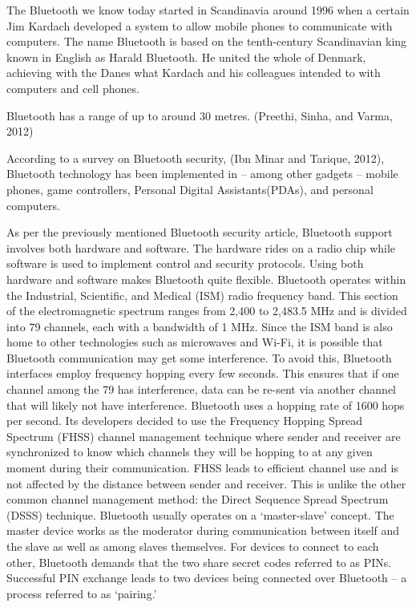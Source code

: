\documentclass[12pt,svgnames,smaller]{article} %
\begin{document}
\begin{enumerate}
	The Bluetooth we know today started in Scandinavia around 1996 when a certain Jim Kardach developed a system to allow mobile phones to communicate with computers. The name Bluetooth is based on the tenth-century Scandinavian king known in English as Harald Bluetooth. He united the whole of Denmark, achieving with the Danes what Kardach and his colleagues intended to with computers and cell phones.  
	
	Bluetooth has a range of up to around 30 metres. (Preethi, Sinha, and Varma, 2012) 
	
	According to a survey on Bluetooth security, (Ibn Minar and Tarique, 2012), Bluetooth technology has been implemented in – among other gadgets – mobile phones, game controllers, Personal Digital Assistants(PDAs), and personal computers.
	
	As per the previously mentioned Bluetooth security article, Bluetooth support involves both hardware and software. The hardware rides on a radio chip while software is used to implement control and security protocols. Using both hardware and software makes Bluetooth quite flexible. 
	Bluetooth operates within the Industrial, Scientific, and Medical (ISM) radio frequency band. This section of the electromagnetic spectrum ranges from 2,400 to 2,483.5 MHz and is divided into 79 channels, each with a bandwidth of 1 MHz. Since the ISM band is also home to other technologies such as microwaves and Wi-Fi, it is possible that Bluetooth communication may get some interference. To avoid this, Bluetooth interfaces employ frequency hopping every few seconds. This ensures that if one channel among the 79 has interference, data can be re-sent via another channel that will likely not have interference. Bluetooth uses a hopping rate of 1600 hops per second. Its developers decided to use the Frequency Hopping Spread Spectrum (FHSS) channel management technique where sender and receiver are synchronized to know which channels they will be hopping to at any given moment during their communication. FHSS leads to efficient channel use and is not affected by the distance between sender and receiver. This is unlike the other common channel management method: the Direct Sequence Spread Spectrum (DSSS) technique.
	Bluetooth usually operates on a ‘master-slave’ concept. The master device works as the moderator during communication between itself and the slave as well as among slaves themselves. For devices to connect to each other, Bluetooth demands that the two share secret codes referred to as PINs. Successful PIN exchange leads to two devices being connected over Bluetooth – a process referred to as ‘pairing.’
	

\end{enumerate}
\end{document}
